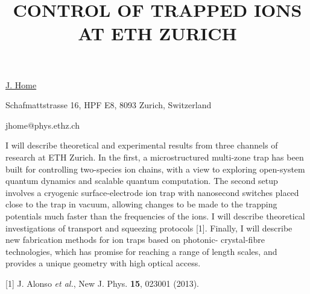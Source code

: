 \title{CONTROL OF TRAPPED IONS AT ETH ZURICH}

\underline{J. Home} 

{\normalsize{\vspace{-4mm}
Schafmattstrasse 16, HPF E8,
8093 Zurich,
Switzerland

\email jhome@phys.ethz.ch}}

I will describe theoretical and experimental results from three channels of research at ETH Zurich.
In the first, a microstructured multi-zone trap has been built for controlling two-species ion
chains, with a view to exploring open-system quantum dynamics and scalable quantum computation. The
second setup involves a cryogenic surface-electrode ion trap with nanosecond switches placed close
to the trap in vacuum, allowing changes to be made to the trapping potentials much faster than the
frequencies of the ions. I will describe theoretical investigations of transport and squeezing
protocols [1]. Finally, I will describe new fabrication methods for ion traps based on photonic-
crystal-fibre technologies, which has promise for reaching a range of length scales, and provides a
unique geometry with high optical access.

{\normalsize
[1] J. Alonso \textit{et al.}, New J. Phys. \textbf{15}, 023001 (2013).
}

\vspace{\baselineskip}

